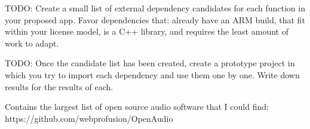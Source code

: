 TODO: Create a small list of external dependency candidates for each function in your proposed app. Favor dependencies that: already have an ARM build, that fit within your license model, is a C++ library, and requires the least amount of work to adapt.

TODO: Once the candidate list has been created, create a prototype project in which you try to import each dependency and use them one by one. Write down results for the results of each.



Contains the largest list of open source audio software that I could find:
https://github.com/webprofusion/OpenAudio
